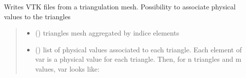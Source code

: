 \documentclass[letterpaper,10pt,english]{sphinxmanual}
\begin{document}
\begin{fulllineitems}
\label{\detokenize{reference:VTK.VTKtriangles}}
\pysigstartsignatures
{}
\pysigstopsignatures
\sphinxAtStartPar
Writes VTK files from a triangulation mesh. Possibility to associate physical values to the triangles
\begin{quote}\begin{description}
\begin{itemize}
\item {} 
\sphinxAtStartPar
{} () \textendash{} 
\sphinxAtStartPar
triangles mesh aggregated by indice elements

\begin{sphinxVerbatim}[commandchars=\\\{\}]
   \PYG{p}{[}  \PYG{p}{]}
\end{sphinxVerbatim}


\item {} 
\sphinxAtStartPar
{} () \textendash{} 
\sphinxAtStartPar
list of physical values associated to each triangle. Each element of var is a physical value for each triangle.
Then, for n triangles and m values, var looks like:

\begin{sphinxVerbatim}[commandchars=\\\{\}]
  \PYG{p}{[}\PYG{p}{[}  \PYG{p}{]}  \PYG{p}{[}  \PYG{p}{]}\PYG{p}{]}
\end{sphinxVerbatim}



\end{itemize}
\end{description}
\end{quote}
\end{fulllineitems}
\end{document}
